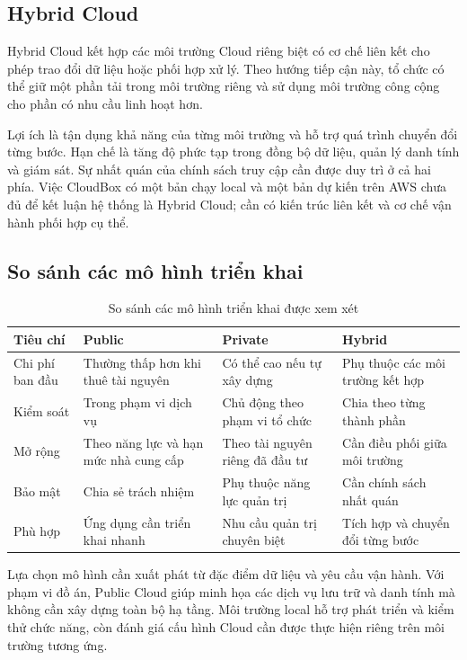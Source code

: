 \subsection{Hybrid Cloud}
Hybrid Cloud kết hợp các môi trường Cloud riêng biệt có cơ chế liên kết cho phép trao đổi dữ liệu hoặc phối hợp xử lý. Theo hướng tiếp cận này, tổ chức có thể giữ một phần tải trong môi trường riêng và sử dụng môi trường công cộng cho phần có nhu cầu linh hoạt hơn.

Lợi ích là tận dụng khả năng của từng môi trường và hỗ trợ quá trình chuyển đổi từng bước. Hạn chế là tăng độ phức tạp trong đồng bộ dữ liệu, quản lý danh tính và giám sát. Sự nhất quán của chính sách truy cập cần được duy trì ở cả hai phía. Việc CloudBox có một bản chạy local và một bản dự kiến trên AWS chưa đủ để kết luận hệ thống là Hybrid Cloud; cần có kiến trúc liên kết và cơ chế vận hành phối hợp cụ thể.

\subsection{So sánh các mô hình triển khai}
\begin{table}[htbp]
\centering\small
\caption{So sánh các mô hình triển khai được xem xét}
\begin{tabularx}{\textwidth}{@{}>{\raggedright\arraybackslash}p{2.2cm}XXX@{}}
\toprule
\textbf{Tiêu chí} & \textbf{Public} & \textbf{Private} & \textbf{Hybrid} \\
\midrule
Chi phí ban đầu & Thường thấp hơn khi thuê tài nguyên & Có thể cao nếu tự xây dựng & Phụ thuộc các môi trường kết hợp \\
Kiểm soát & Trong phạm vi dịch vụ & Chủ động theo phạm vi tổ chức & Chia theo từng thành phần \\
Mở rộng & Theo năng lực và hạn mức nhà cung cấp & Theo tài nguyên riêng đã đầu tư & Cần điều phối giữa môi trường \\
Bảo mật & Chia sẻ trách nhiệm & Phụ thuộc năng lực quản trị & Cần chính sách nhất quán \\
Phù hợp & Ứng dụng cần triển khai nhanh & Nhu cầu quản trị chuyên biệt & Tích hợp và chuyển đổi từng bước \\
\bottomrule
\end{tabularx}
\end{table}

Lựa chọn mô hình cần xuất phát từ đặc điểm dữ liệu và yêu cầu vận hành. Với phạm vi đồ án, Public Cloud giúp minh họa các dịch vụ lưu trữ và danh tính mà không cần xây dựng toàn bộ hạ tầng. Môi trường local hỗ trợ phát triển và kiểm thử chức năng, còn đánh giá cấu hình Cloud cần được thực hiện riêng trên môi trường tương ứng.

